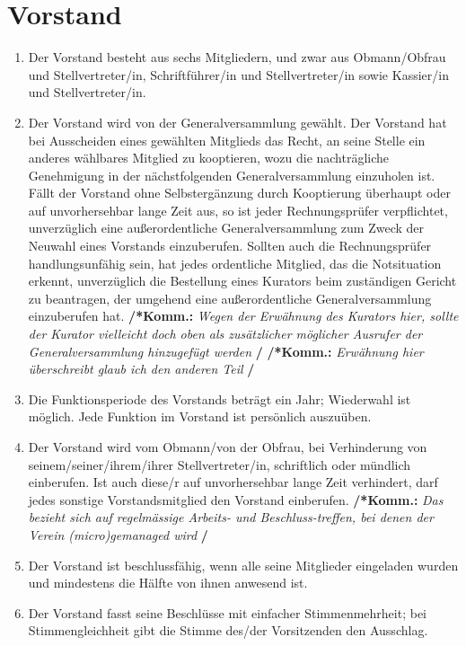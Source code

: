 \documentclass[a4paper,12pt]{article}
\newcommand{\comment}[1]{{\bf /*Komm.:} \textit{#1} {\bf */}}
\begin{document}
\section{Vorstand} %
\begin{enumerate}

\item Der Vorstand besteht aus sechs Mitgliedern, und zwar aus Obmann/Obfrau und Stellvertreter/in, Schriftführer/in und Stellvertreter/in sowie Kassier/in und Stellvertreter/in.
\item Der Vorstand wird von der Generalversammlung gewählt.
Der Vorstand hat bei Ausscheiden eines gewählten Mitglieds das Recht, an seine Stelle ein anderes wählbares Mitglied zu kooptieren, wozu die nachträgliche Genehmigung in der nächstfolgenden Generalversammlung einzuholen ist.
Fällt der Vorstand ohne Selbstergänzung durch Kooptierung überhaupt oder auf unvorhersehbar lange Zeit aus, so ist jeder Rechnungsprüfer verpflichtet, unverzüglich eine außerordentliche Generalversammlung zum Zweck der Neuwahl eines Vorstands einzuberufen.
Sollten auch die Rechnungsprüfer handlungsunfähig sein, hat jedes ordentliche Mitglied, das die Notsituation erkennt, unverzüglich die Bestellung eines Kurators beim zuständigen Gericht zu beantragen, der umgehend eine außerordentliche Generalversammlung einzuberufen hat.
\comment{Wegen der Erwähnung des Kurators hier, sollte der Kurator vielleicht doch oben als zusätzlicher möglicher Ausrufer der Generalversammlung hinzugefügt werden}
\comment{Erw\"ahnung hier \"uberschreibt glaub ich den anderen Teil}

\item \label{item:funktionsperiode} Die Funktionsperiode des Vorstands beträgt ein Jahr; Wiederwahl ist möglich.
Jede Funktion im Vorstand ist persönlich auszuüben.

\item Der Vorstand wird vom Obmann/von der Obfrau, bei Verhinderung von seinem/seiner/ihrem/ihrer Stellvertreter/in, schriftlich oder mündlich einberufen. Ist auch diese/r auf unvorhersehbar lange Zeit verhindert, darf jedes sonstige Vorstandsmitglied den Vorstand einberufen.
\comment{Das bezieht sich auf regelmässige Arbeits- und Beschluss-treffen, bei denen der Verein (micro)gemanaged wird}

\item Der Vorstand ist beschlussfähig, wenn alle seine Mitglieder eingeladen wurden und mindestens die Hälfte von ihnen anwesend ist.

\item Der Vorstand fasst seine Beschlüsse mit einfacher Stimmenmehrheit; bei Stimmengleichheit gibt die Stimme des/der Vorsitzenden den Ausschlag.


\end{enumerate}
\end{document}
